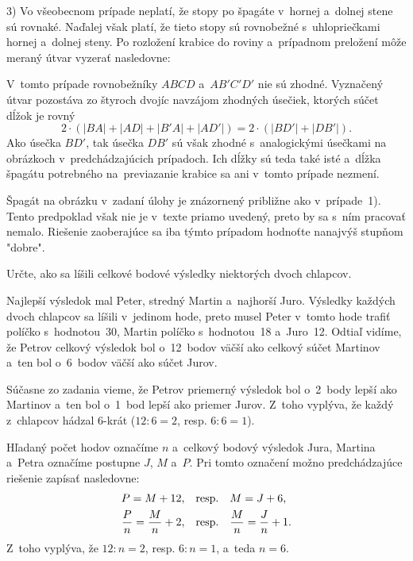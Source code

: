 {3)
Vo všeobecnom prípade neplatí, že stopy po špagáte v~hornej a~dolnej stene sú
rovnaké.
Naďalej však platí, že tieto stopy sú rovnobežné s~uhlopriečkami hornej a~dolnej steny.
Po rozložení krabice do roviny a~prípadnom preložení môže meraný útvar
vyzerať nasledovne:
%

V~tomto prípade rovnobežníky $ABCD$ a~$AB'C'D'$ nie sú zhodné.
Vyznačený útvar pozostáva zo štyroch dvojíc navzájom zhodných úsečiek, ktorých
súčet dĺžok je rovný
$$
2\cdot(|BA|+|AD|+|B'A|+|AD'|)=
2\cdot(|BD'|+|DB'|).
$$
Ako úsečka $BD'$, tak úsečka $DB'$ sú však zhodné s~analogickými úsečkami
na obrázkoch v~predchádzajúcich prípadoch.
Ich dĺžky sú teda také isté a~dĺžka špagátu potrebného na~previazanie krabice
sa ani v~tomto prípade nezmení.

\poznamka
Špagát na obrázku v~zadaní úlohy je znázornený približne ako v~prípade~1).
Tento predpoklad však nie je v~texte priamo uvedený, preto
by sa s~ním pracovať nemalo.
Riešenie zaoberajúce sa iba týmto prípadom hodnoťte nanajvýš stupňom "dobre".
}

{%
\napad
Určte, ako sa líšili celkové bodové výsledky niektorých dvoch chlapcov.

\riesenie
Najlepší výsledok mal Peter, stredný Martin a~najhorší Juro.
Výsledky každých dvoch chlapcov sa líšili v~jedinom hode,
preto musel Peter v~tomto hode trafiť políčko s~hodnotou~30, Martin políčko s~hodnotou~18 a~Juro~12.
Odtiaľ vidíme, že Petrov celkový výsledok bol o~12~bodov väčší ako celkový
súčet Martinov a~ten bol o~6~bodov väčší ako súčet Jurov.

Súčasne zo zadania vieme, že Petrov priemerný výsledok bol o~2~body lepší ako
Martinov a~ten bol o~1~bod lepší ako priemer Jurov.
Z~toho vyplýva, že každý z~chlapcov hádzal 6-krát ($12:6=2$, resp. $6:6=1$).

\poznamka
Hľadaný počet hodov označíme $n$ a~celkový bodový výsledok
Jura, Martina a~Petra označíme postupne $J$, $M$ a~$P$.
Pri tomto označení možno predchádzajúce riešenie zapísať nasledovne:
$$
\aligned
P=M+12,
&\quad\text{resp.}\quad
M=J+6,\\
\frac{P}n=\frac{M}n+2,
&\quad\text{resp.}\quad
\frac{M}n=\frac{J}n+1.
\endaligned
$$
Z~toho vyplýva, že $12:n=2$, resp. $6:n=1$, a~teda $n=6$.
}

